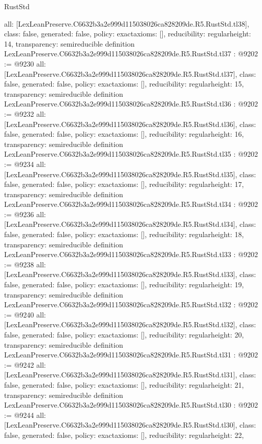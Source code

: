 \begin{lexlean}{RustStd}
\begin{coremodule}
{  all: [LexLeanPreserve.C6632b3a2e999d115038026ca828209de.R5.RustStd.tl38],
  class: false,
  generated: false,
  policy: exact{axioms: []},
  reducibility: regular{height: 14},
  transparency: semireducible
}
definition LexLeanPreserve.C6632b3a2e999d115038026ca828209de.R5.RustStd.tl37 : @9202 := @9230 {
  all: [LexLeanPreserve.C6632b3a2e999d115038026ca828209de.R5.RustStd.tl37],
  class: false,
  generated: false,
  policy: exact{axioms: []},
  reducibility: regular{height: 15},
  transparency: semireducible
}
definition LexLeanPreserve.C6632b3a2e999d115038026ca828209de.R5.RustStd.tl36 : @9202 := @9232 {
  all: [LexLeanPreserve.C6632b3a2e999d115038026ca828209de.R5.RustStd.tl36],
  class: false,
  generated: false,
  policy: exact{axioms: []},
  reducibility: regular{height: 16},
  transparency: semireducible
}
definition LexLeanPreserve.C6632b3a2e999d115038026ca828209de.R5.RustStd.tl35 : @9202 := @9234 {
  all: [LexLeanPreserve.C6632b3a2e999d115038026ca828209de.R5.RustStd.tl35],
  class: false,
  generated: false,
  policy: exact{axioms: []},
  reducibility: regular{height: 17},
  transparency: semireducible
}
definition LexLeanPreserve.C6632b3a2e999d115038026ca828209de.R5.RustStd.tl34 : @9202 := @9236 {
  all: [LexLeanPreserve.C6632b3a2e999d115038026ca828209de.R5.RustStd.tl34],
  class: false,
  generated: false,
  policy: exact{axioms: []},
  reducibility: regular{height: 18},
  transparency: semireducible
}
definition LexLeanPreserve.C6632b3a2e999d115038026ca828209de.R5.RustStd.tl33 : @9202 := @9238 {
  all: [LexLeanPreserve.C6632b3a2e999d115038026ca828209de.R5.RustStd.tl33],
  class: false,
  generated: false,
  policy: exact{axioms: []},
  reducibility: regular{height: 19},
  transparency: semireducible
}
definition LexLeanPreserve.C6632b3a2e999d115038026ca828209de.R5.RustStd.tl32 : @9202 := @9240 {
  all: [LexLeanPreserve.C6632b3a2e999d115038026ca828209de.R5.RustStd.tl32],
  class: false,
  generated: false,
  policy: exact{axioms: []},
  reducibility: regular{height: 20},
  transparency: semireducible
}
definition LexLeanPreserve.C6632b3a2e999d115038026ca828209de.R5.RustStd.tl31 : @9202 := @9242 {
  all: [LexLeanPreserve.C6632b3a2e999d115038026ca828209de.R5.RustStd.tl31],
  class: false,
  generated: false,
  policy: exact{axioms: []},
  reducibility: regular{height: 21},
  transparency: semireducible
}
definition LexLeanPreserve.C6632b3a2e999d115038026ca828209de.R5.RustStd.tl30 : @9202 := @9244 {
  all: [LexLeanPreserve.C6632b3a2e999d115038026ca828209de.R5.RustStd.tl30],
  class: false,
  generated: false,
  policy: exact{axioms: []},
  reducibility: regular{height: 22},
}
\end{coremodule}
\end{lexlean}
